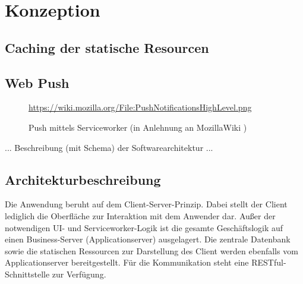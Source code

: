 \chapter{Konzeption}
\label{sec_konzeption}

\section{Caching der statische Resourcen}

\section{Web Push}
\label{subsubsec_konzeption_serviceworker_push-api}

\begin{figure}[htp] 
\caption{Push mittels Serviceworker (in Anlehnung an MozillaWiki \cite{MOZ_WIKI})}
\quelle\url{https://wiki.mozilla.org/File:PushNotificationsHighLevel.png}
\label{image_architektur-serviceworker-push}
\end{figure}  

... Beschreibung (mit Schema) der Softwarearchitektur ...


\section{Architekturbeschreibung}
\label{sec_konzeption_serviceworker_architektur}

Die Anwendung beruht auf dem Client-Server-Prinzip. Dabei stellt der Client lediglich die Oberfläche zur Interaktion mit dem Anwender dar. Außer der notwendigen UI- und Serviceworker-Logik ist die gesamte Geschäftslogik auf einen Business-Server (Applicationserver) ausgelagert. Die zentrale Datenbank sowie die statischen Ressourcen zur Darstellung des Client werden ebenfalls vom Applicationserver bereitgestellt. Für die Kommunikation steht eine RESTful-Schnittstelle zur Verfügung.

